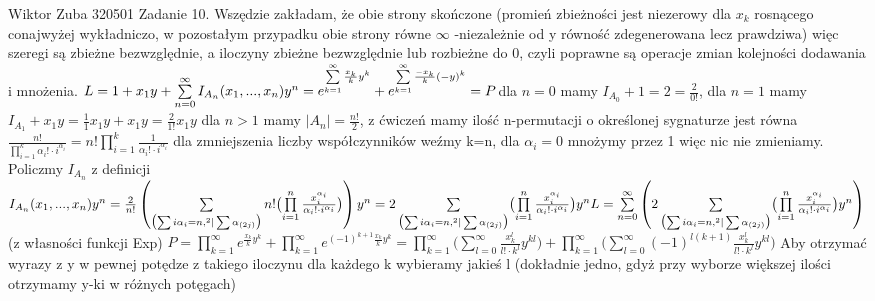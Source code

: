 \documentclass{article}
\begin{document}
Wiktor Zuba 320501
\newline
Zadanie 10.
\newline
\newline
Wszędzie zakładam, że obie strony skończone (promień zbieżności jest niezerowy dla $x_k$ rosnącego conajwyżej wykładniczo, w pozostałym przypadku obie strony równe $\infty$
-niezależnie od y równość zdegenerowana lecz prawdziwa) więc szeregi są zbieżne bezwzględnie, a iloczyny zbieżne bezwzględnie lub rozbieżne do 0,
czyli poprawne są operacje zmian kolejności dodawania i mnożenia.\newline
$
L=1+x_1y+\sum\limits_{n=0}^{\infty}I_{A_n}(x_1,...,x_n)y^n=e^{\sum\limits_{k=1}^{\infty}\frac{x_k}{k}y^k}+e^{\sum\limits_{k=1}^{\infty}\frac{-x_k}{k}(-y)^k}=P\newline
$dla $n=0$ mamy $I_{A_0}+1=2=\frac{2}{0!}$, dla $n=1$ mamy $I_{A_1}+x_1y=\frac{1}{1}x_1y+x_1y=\frac{2}{1!}x_1y$\newline
dla $n>1$ mamy $|A_n|=\frac{n!}{2}$, z ćwiczeń mamy ilość n-permutacji o określonej sygnaturze jest równa 
$\frac{n!}{\prod\limits_{i=1}^{k}\alpha_i!\cdot i^{\alpha_i}}=n!\prod\limits_{i=1}^{k}\frac{1}{\alpha_i!\cdot i^{\alpha_i}}$
dla zmniejszenia liczby współczynników weźmy k=n, dla $\alpha_i=0$ mnożymy przez 1 więc nic nie zmieniamy. Policzmy $I_{A_n}$ z definicji\newline
$I_{A_n}(x_1,...,x_n)y^n=\frac{2}{n!}\left(\sum\limits_{\bigl(\sum i\alpha_i=n,^2|\sum\alpha_{(2j)}\bigr)}n!\bigl(\prod\limits_{i=1}^{n}\frac{x_i^{\alpha_i}}{\alpha_i!\cdot i^{\alpha_i}}\bigr)\right)y^n
=2\sum\limits_{\bigl(\sum i\alpha_i=n,^2|\sum\alpha_{(2j)}\bigr)}\bigl(\prod\limits_{i=1}^{n}\frac{x_i^{\alpha_i}}{\alpha_i!\cdot i^{\alpha_i}}\bigr)y^n\newline
L=\sum\limits_{n=0}^{\infty}\left(2\sum\limits_{\bigl(\sum i\alpha_i=n,^2|\sum\alpha_{(2j)}\bigr)}\bigl(\prod\limits_{i=1}^{n}\frac{x_i^{\alpha_i}}{\alpha_i!\cdot i^{\alpha_i}}\bigr)y^n\right)\newline
$ (z własności funkcji Exp) $
P=\prod\limits_{k=1}^{\infty}e^{\frac{x_k}{k}y^k}+\prod\limits_{k=1}^{\infty}e^{(-1)^{k+1}\frac{x_k}{k}y^k}=
\prod\limits_{k=1}^{\infty}\bigl(\sum\limits_{l=0}^{\infty}\frac{x_k^l}{l!\cdot k^l}y^{kl}\bigr)+\prod\limits_{k=1}^{\infty}\bigl(\sum\limits_{l=0}^{\infty}(-1)^{l(k+1)}\frac{x_k^l}{l!\cdot k^l}y^{kl}\bigr)
$\newline
Aby otrzymać wyrazy z y w pewnej potędze z takiego iloczynu dla każdego k wybieramy jakieś l (dokładnie jedno, gdyż przy wyborze większej ilości otrzymamy y-ki w różnych potęgach)
\end{document}
